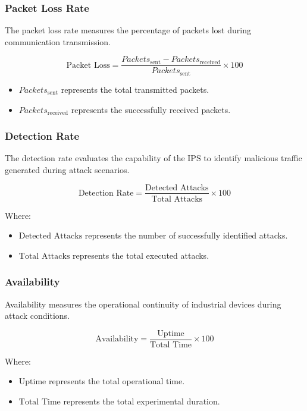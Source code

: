\documentclass[sigconf]{acmart}
\begin{document}
\subsubsection{Packet Loss Rate}
The packet loss rate measures the percentage of packets lost during communication transmission.

\begin{equation*}
\text{Packet Loss} = \frac{Packets_{\text{sent}} - Packets_{\text{received}}}{Packets_{\text{sent}}} \times 100
\end{equation*}

\begin{itemize}
    \item $Packets_{\text{sent}}$ represents the total transmitted packets.
    \item $Packets_{\text{received}}$ represents the successfully received packets.
\end{itemize}

\subsubsection{Detection Rate}
The detection rate evaluates the capability of the IPS to identify malicious traffic generated during attack scenarios.

\[
\text{Detection Rate} = \frac{\text{Detected Attacks}}{\text{Total Attacks}} \times 100
\]

Where:
\begin{itemize}
    \item $\text{Detected Attacks}$ represents the number of successfully identified attacks.
    \item $\text{Total Attacks}$ represents the total executed attacks.
\end{itemize}

\subsubsection{Availability}
Availability measures the operational continuity of industrial devices during attack conditions.

\[
\text{Availability} = \frac{\text{Uptime}}{\text{Total Time}} \times 100
\]

Where:
\begin{itemize}
    \item $\text{Uptime}$ represents the total operational time.
    \item $\text{Total Time}$ represents the total experimental duration.
\end{itemize}
\end{document}
